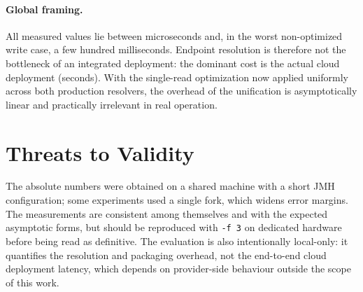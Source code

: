 \paragraph{Global framing.}
All measured values lie between microseconds and, in the worst non-optimized write case,
a few hundred milliseconds. Endpoint resolution is therefore not the bottleneck of an integrated
deployment: the dominant cost is the actual cloud deployment (seconds). With the single-read
optimization now applied uniformly across both production resolvers, the overhead of the
unification is asymptotically linear and practically irrelevant in real operation.

\section{Threats to Validity}
\label{sec:eval-threats}

The absolute numbers were obtained on a shared machine with a short JMH configuration; some
experiments used a single fork, which widens error margins. The measurements are consistent among
themselves and with the expected asymptotic forms, but should be reproduced with \texttt{-f 3} on
dedicated hardware before being read as definitive. The evaluation is also intentionally
local-only: it quantifies the resolution and packaging overhead, not the end-to-end cloud
deployment latency, which depends on provider-side behaviour outside the scope of this work.

